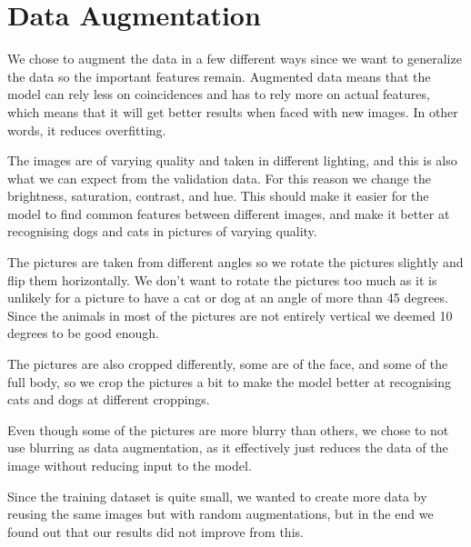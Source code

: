 \section{Data Augmentation}
We chose to augment the data in a few different ways since we want to generalize the data so the important features remain. 
Augmented data means that the model can rely less on coincidences and has to rely more on actual features, which means that it will get better results when faced with new images. In other words, it reduces overfitting.

The images are of varying quality and taken in different lighting, and this is also what we can expect from the validation data.
For this reason we change the brightness, saturation, contrast, and hue. This should make it easier for the model to find common features between different images, and make it better at recognising dogs and cats in pictures of varying quality.

The pictures are taken from different angles so we rotate the pictures slightly and flip them horizontally. We don't want to rotate the pictures too much as it is unlikely for a picture to have a cat or dog at an angle of more than 45 degrees.
Since the animals in most of the pictures are not entirely vertical we deemed 10 degrees to be good enough.

The pictures are also cropped differently, some are of the face, and some of the full body, so we crop the pictures a bit to make the model better at recognising cats and dogs at different croppings.

Even though some of the pictures are more blurry than others, we chose to not use blurring as data augmentation, as it effectively just reduces the data of the image without reducing input to the model.

Since the training dataset is quite small, we wanted to create more data by reusing the same images but with random augmentations, but in the end we found out that our results did not improve from this.